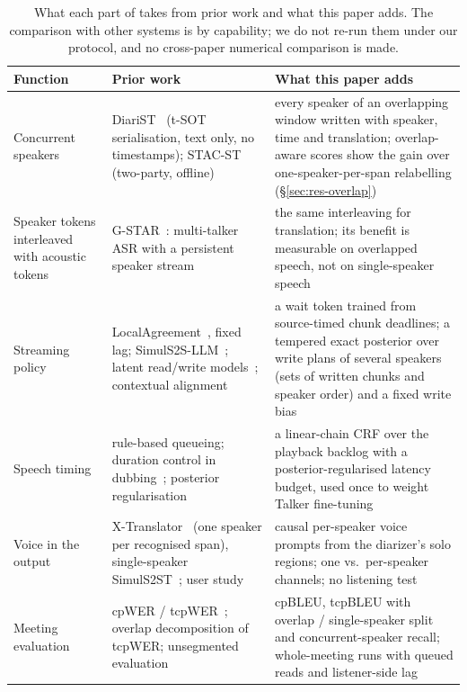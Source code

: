 \begin{table}[t]
\centering\footnotesize
\setlength{\tabcolsep}{3pt}
\begin{tabular}{p{3.3cm}p{5.4cm}p{6.0cm}}
\toprule
Function & Prior work & What this paper adds \\
\midrule
Concurrent speakers & DiariST~\citep{yang2024diarist} (t-SOT serialisation, text only, no timestamps); STAC-ST~\citep{zuluaga2023stac} (two-party, offline) & every speaker of an overlapping window written with speaker, time and translation; overlap-aware scores show the gain over one-speaker-per-span relabelling (\S\ref{sec:res-overlap}) \\
Speaker tokens interleaved with acoustic tokens & G-STAR~\citep{peng2026gstar}: multi-talker ASR with a persistent speaker stream & the same interleaving for translation; its benefit is measurable on overlapped speech, not on single-speaker speech \\
Streaming policy & LocalAgreement~\citep{liu2020low,polak2022cuni}, fixed lag; SimulS2S-LLM~\citep{deng2025simuls2s}; latent read/write models~\citep{arivazhagan2019milk,ma2020mma,zhang2023hmt}; contextual alignment~\citep{labiausse2025hibiki} & a wait token trained from source-timed chunk deadlines; a tempered exact posterior over write plans of several speakers (sets of written chunks and speaker order) and a fixed write bias \\
Speech timing & rule-based queueing; duration control in dubbing~\citep{lakew2022isometric}; posterior regularisation~\citep{ganchev2010posterior} & a linear-chain CRF over the playback backlog with a posterior-regularised latency budget, used once to weight Talker fine-tuning \\
Voice in the output & X-Translator~\citep{zhao2026xtranslator} (one speaker per recognised span), single-speaker SimulS2ST~\citep{seamless2023,labiausse2025hibiki,cheng2025liveinterpret}; user study~\citep{ma2026samevoice} & causal per-speaker voice prompts from the diarizer's solo regions; one vs.\ per-speaker channels; no listening test \\
Meeting evaluation & cpWER / tcpWER~\citep{watanabe2020chime6,neumann2023meeteval}; overlap decomposition of tcpWER; unsegmented evaluation~\citep{papi2025real} & cpBLEU, tcpBLEU with overlap / single-speaker split and concurrent-speaker recall; whole-meeting runs with queued reads and listener-side lag \\
\bottomrule
\end{tabular}
\caption{What each part of \sys{} takes from prior work and what this paper adds. The comparison with other systems is
by capability; we do not re-run them under our protocol, and no cross-paper numerical comparison is made.}
\label{tab:related7}
\end{table}


